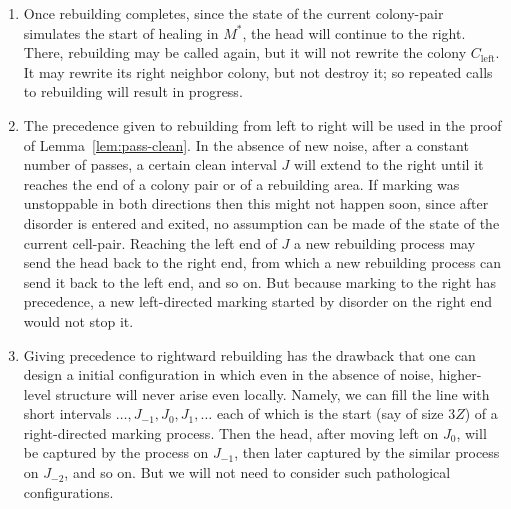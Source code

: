 \documentclass[11pt]{memoir}
\theoremstyle{definition} %
\newcommand{\Z}{Z} %
\newcommand{\Left}{\text{left}}
\begin{document}
\begin{remarks}\label{rem:rebuild-precedence}
  \begin{enumerate}
  \item
    Once rebuilding completes, since the state of the current colony-pair simulates the start of
    healing in \( M^{*} \), the head will continue to the right.
    There, rebuilding may be called again, but it will not rewrite the colony \( C_{\Left} \).
    It may rewrite its right neighbor colony, but not destroy it; so repeated calls to rebuilding
    will result in progress.
    
  \item The precedence given to rebuilding from left to right
    will be used in the proof of Lemma~\ref{lem:pass-clean}.
    In the absence of new noise, after a constant number of passes,
    a certain clean interval \( J \) will extend to the right until it reaches
the end of a colony pair or of a rebuilding area.
If marking was unstoppable in both directions then this might not happen soon, since after disorder
is entered and exited, no assumption can be made of the state of the current cell-pair.
Reaching the left end of  \( J \)
a new rebuilding process may send the head back to the right end, from which a new rebuilding
process can send it back to the left end, and so on.
But because marking to the right has precedence, a new left-directed
marking started by disorder on the right end would not stop it.

\item Giving precedence to rightward rebuilding has the drawback that one can design a initial configuration
  in which even in the absence of noise, higher-level structure will never arise even locally.
  Namely, we can fill the line with short intervals \( \dots,J_{-1},J_{0},J_{1},\dots \)
  each of which is the start (say of size \( 3\Z \)) of a
  right-directed marking process.
  Then the head, after moving left on \( J_{0} \), will be captured by the process on \( J_{-1} \), then
  later captured by the similar process on \( J_{-2} \), and so on.
  But we will not need to consider such pathological configurations.

  
  \end{enumerate}
\end{remarks}
\end{document}
